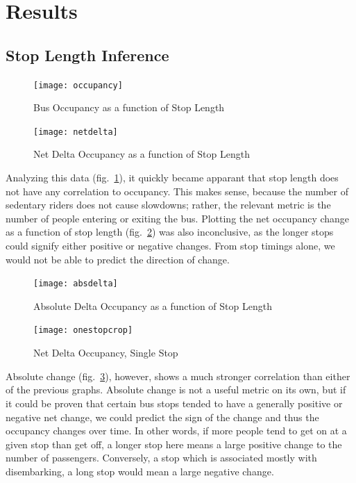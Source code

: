 \section{Results}

\subsection*{Stop Length Inference}
\begin{figure}[!t]
  \texttt{[image: occupancy]}
  \caption{Bus Occupancy as a function of Stop Length} %
  \label{fig:occ}
\end{figure}
\begin{figure}[!t]
  \texttt{[image: netdelta]}
  \caption{Net Delta Occupancy as a function of Stop Length}
  \label{fig:netdelta}
\end{figure}

Analyzing this data (fig.~\ref{fig:occ}), it quickly became apparant that stop length does not have any correlation to occupancy.
This makes sense, because the number of sedentary riders does not cause slowdowns; rather, the relevant metric is the number of people entering or exiting the bus.
Plotting the net occupancy change as a function of stop length (fig.~\ref{fig:netdelta}) was also inconclusive, as the longer stops could signify either positive or negative changes.
From stop timings alone, we would not be able to predict the direction of change.

\pagebreak
    
\begin{figure}[!t]
  \texttt{[image: absdelta]}
  \caption{Absolute Delta Occupancy as a function of Stop Length}
  \label{fig:absdelta}
\end{figure}

\begin{figure}[!t]
  \texttt{[image: onestopcrop]}
  \caption{Net Delta Occupancy, Single Stop}
  \label{fig:onestop}
\end{figure}

Absolute change (fig.~\ref{fig:absdelta}), however, shows a much stronger correlation than either of the previous graphs.
Absolute change is not a useful metric on its own, but if it could be proven that certain bus stops tended to have a generally positive or negative net change, we could predict the sign of the change and thus the occupancy changes over time.
In other words, if more people tend to get on at a given stop than get off, a longer stop here means a large positive change to the number of passengers.
Conversely, a stop which is associated mostly with disembarking, a long stop would mean a large negative change.

